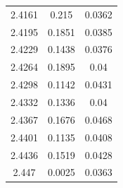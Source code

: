 \documentclass[twocolumn,tight,times]{aastex63}
\begin{document}
\begin{center}
\begin{longtable}{c|c|c}
2.4161 & 0.215 & 0.0362 \\
2.4195 & 0.1851 & 0.0385 \\
2.4229 & 0.1438 & 0.0376 \\
2.4264 & 0.1895 & 0.04 \\
2.4298 & 0.1142 & 0.0431 \\
2.4332 & 0.1336 & 0.04 \\
2.4367 & 0.1676 & 0.0468 \\
2.4401 & 0.1135 & 0.0408 \\
2.4436 & 0.1519 & 0.0428 \\
2.447 & 0.0025 & 0.0363 \\
\end{longtable}
\end{center}
\end{document}
